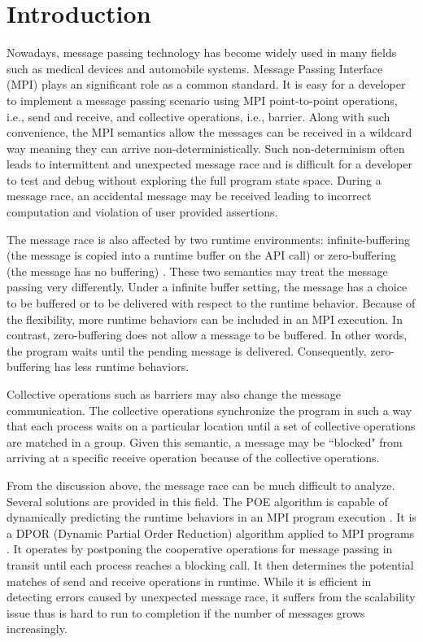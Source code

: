 \section{Introduction}
Nowadays, message passing technology has become widely used in many fields such as medical devices and automobile systems. Message Passing Interface (MPI) plays an significant role as a common standard. It is easy for a developer to implement a message passing scenario using MPI point-to-point operations, i.e., send and receive, and collective operations, i.e., barrier. Along with such convenience, the MPI semantics allow the messages can be received in a wildcard way meaning they can arrive non-deterministically. Such non-determinism often leads to intermittent and unexpected message race and is difficult for a developer to test and debug without exploring the full program state space. During a message race, an accidental message may be received leading to incorrect computation and violation of user provided assertions. 

The message race is also affected by two runtime environments: infinite-buffering (the message is copied into a runtime buffer on the API call) or zero-buffering (the message has no buffering) \cite{DBLP:conf/fm/VakkalankaVGK09}. These two semantics may treat the message passing very differently. Under a infinite buffer setting, the message has a choice to be buffered or to be delivered with respect to the runtime behavior. Because of the flexibility, more runtime behaviors can be included in an MPI execution. In contrast, zero-buffering does not allow a message to be buffered. In other words, the program waits until the pending message is delivered. Consequently, zero-buffering has less runtime behaviors.

Collective operations such as barriers may also change the message communication. The collective operations synchronize the program in such a way that each process waits on a particular location until a set of collective operations are matched in a group. Given this semantic, a message may be ``blocked" from arriving at a specific receive operation because of the collective operations. 


From the discussion above, the message race can be much difficult to analyze. Several solutions are provided in this field. The POE algorithm is capable of dynamically predicting the runtime behaviors in an MPI program execution \cite{DBLP:conf/ppopp/VakkalankaSGK08}. It is a DPOR (Dynamic Partial Order Reduction) algorithm applied to MPI programs \cite{DBLP:conf/popl/FlanaganG05}. It operates by postponing the cooperative operations for message passing in transit until each process reaches a blocking call. It then determines the potential matches of send and receive operations in runtime. While it is efficient in detecting errors caused by unexpected message race, it suffers from the scalability issue thus is hard to run to completion if the number of messages grows increasingly. 

